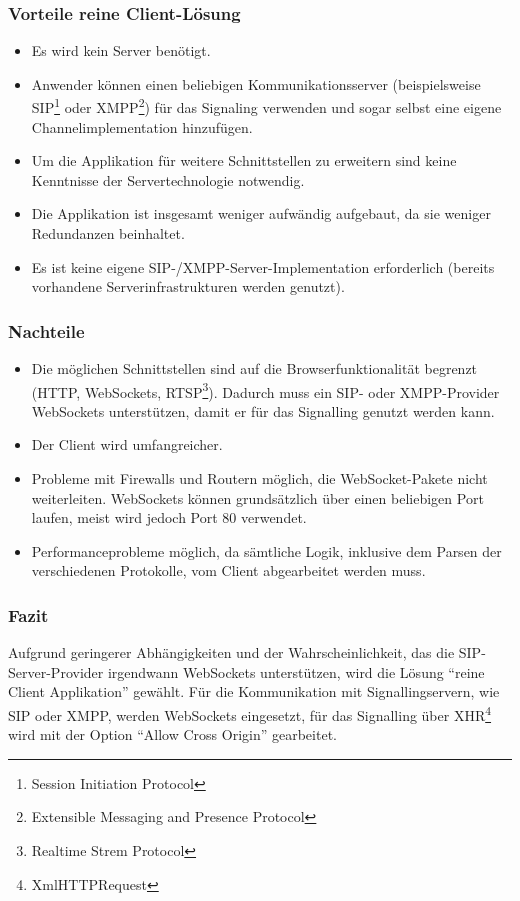 		\subsubsection{Vorteile reine Client-Lösung}
		\begin{itemize}
			\item Es wird kein Server benötigt.
			\item Anwender können einen beliebigen Kommunikationsserver
			(beispielsweise SIP\footnote{Session Initiation Protocol} oder
			XMPP\footnote{Extensible Messaging and Presence Protocol}) für das
			Signaling verwenden und sogar selbst eine eigene Channelimplementation
			hinzufügen.
			\item Um die Applikation für weitere Schnittstellen zu erweitern sind keine
			Kenntnisse der Servertechnologie notwendig.
			\item Die Applikation ist insgesamt weniger aufwändig aufgebaut, da sie
			weniger Redundanzen beinhaltet.
			\item Es ist keine eigene SIP-/XMPP-Server-Implementation erforderlich
			(bereits vorhandene Serverinfrastrukturen werden genutzt).
		\end{itemize}
		\subsubsection{Nachteile}
		\begin{itemize}
			\item Die möglichen Schnittstellen sind auf die Browserfunktionalität
			begrenzt (HTTP, WebSockets, RTSP\footnote{Realtime Strem Protocol}). Dadurch
			muss ein SIP- oder XMPP-Provider WebSockets unterstützen, damit er für das
			Signalling genutzt werden kann.
			\item Der Client wird umfangreicher.
			\item Probleme mit Firewalls und Routern möglich, die WebSocket-Pakete nicht
			weiterleiten. WebSockets können grundsätzlich über einen beliebigen Port laufen, meist wird jedoch Port 80 verwendet.
			\item Performanceprobleme möglich, da sämtliche Logik, inklusive dem Parsen
			der verschiedenen Protokolle, vom Client abgearbeitet werden muss.
		\end{itemize}

		\subsubsection{Fazit}
			Aufgrund geringerer Abhängigkeiten und der Wahrscheinlichkeit, das die
			SIP-Server-Provider irgendwann WebSockets unterstützen, wird die Lösung
			``reine Client Applikation'' gewählt.
			Für die Kommunikation mit Signallingservern, wie SIP oder XMPP, werden
			WebSockets eingesetzt, für das Signalling über XHR\footnote{XmlHTTPRequest}
			wird mit der Option ``Allow Cross Origin'' gearbeitet.

